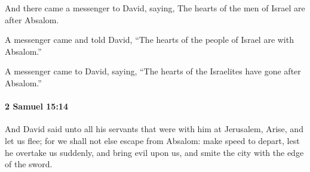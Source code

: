 			\begin{versebox}
					\item[BHS] 
					\item[ASV] And there came a messenger to David, saying, The hearts of the men of Israel are after Absalom.
					\item[NIV] A messenger came and told David, “The hearts of the people of Israel are with Absalom.”
					\item[NRSV] A messenger came to David, saying, “The hearts of the Israelites have gone after Absalom.”
			\end{versebox}

		\paragraph{2 Samuel 15:14} %
			\label{2SAMUEL-15-14}

			And David said unto all his servants that were with him at Jerusalem, Arise, and let us flee; for we shall not else escape from Absalom: make speed to depart, lest he overtake us suddenly, and bring evil upon us, and smite the city with the edge of the sword.

